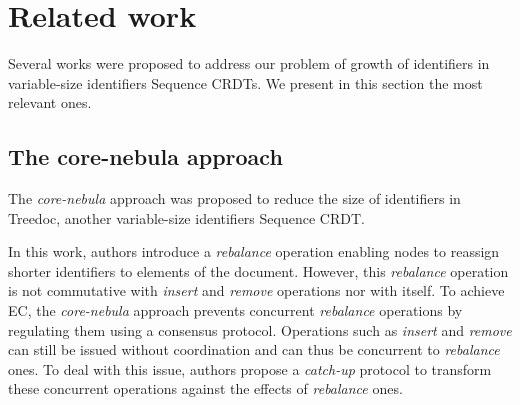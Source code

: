 \documentclass[10pt,journal,compsoc]{IEEEtran}
\begin{document}


\section{Related work}
\label{sec:related-work}

Several works were proposed to address our problem of growth of identifiers in variable-size identifiers Sequence \acp{CRDT}.
We present in this section the most relevant ones.

\subsection{The core-nebula approach}

The \emph{core-nebula} approach \cite{letia:hal-01248270, zawirski:hal-01248197} was proposed to reduce the size of identifiers in Treedoc\cite{5158449}, another variable-size identifiers Sequence \ac{CRDT}.

In this work, authors introduce a \emph{rebalance} operation enabling nodes to reassign shorter identifiers to elements of the document.
However, this \emph{rebalance} operation is not commutative with \emph{insert} and \emph{remove} operations nor with itself.
To achieve \ac{EC}\cite{10.1145/224057.224070}, the \emph{core-nebula} approach prevents concurrent \emph{rebalance} operations by regulating them using a consensus protocol.
Operations such as \emph{insert} and \emph{remove} can still be issued without coordination and can thus be concurrent to \emph{rebalance} ones.
To deal with this issue, authors propose a \emph{catch-up} protocol to transform these concurrent operations against the effects of \emph{rebalance} ones.
\end{document}
